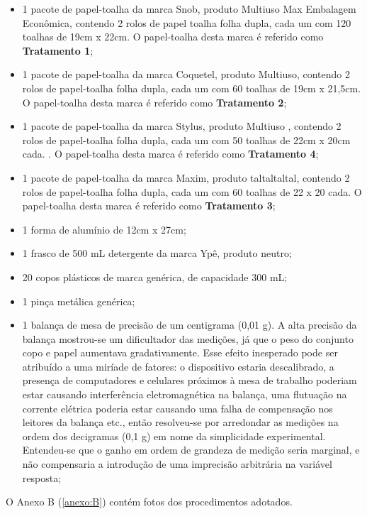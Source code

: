 \documentclass[a4paper,12pt,notitlepage]{article}
\begin{document}
\begin{itemize}
    \item 1 pacote de papel-toalha da marca Snob, produto Multiuso Max Embalagem Econômica, contendo 2 rolos de papel toalha folha dupla, cada um com 120 toalhas de 19cm x 22cm. O papel-toalha desta marca é referido como \textbf{Tratamento 1};
    \item 1 pacote de papel-toalha da marca Coquetel, produto Multiuso, contendo 2 rolos de papel-toalha folha dupla, cada um com 60 toalhas de 19cm x 21,5cm. O papel-toalha desta marca é referido como \textbf{Tratamento 2};
    \item 1 pacote de papel-toalha da marca Stylus, produto Multiuso , contendo 2 rolos de papel-toalha folha dupla, cada um com 50 toalhas de 22cm x 20cm cada. . O papel-toalha desta marca é referido como \textbf{Tratamento 4};
    \item 1 pacote de papel-toalha da marca Maxim, produto taltaltaltal, contendo 2 rolos de papel-toalha folha dupla, cada um com 60 toalhas de 22 x 20 cada. O papel-toalha desta marca é referido como \textbf{Tratamento 3};
    \item 1 forma de alumínio de 12cm x 27cm;
    \item 1 frasco de 500 mL detergente da marca Ypê, produto neutro;
    \item 20 copos plásticos de marca genérica, de capacidade 300 mL;
    \item 1 pinça metálica genérica;
    \item 1 balança de mesa de precisão de um centigrama (0,01 g). A alta precisão da balança mostrou-se um dificultador das medições, já que o peso do conjunto copo e papel aumentava gradativamente. Esse efeito inesperado pode ser atribuído a uma miríade de fatores: o dispositivo estaria descalibrado, a presença de computadores e celulares próximos à mesa de trabalho poderiam estar causando interferência eletromagnética na balança, uma flutuação na corrente elétrica poderia estar causando uma falha de compensação nos leitores da balança etc., então resolveu-se por arredondar as medições na ordem dos decigramas (0,1 g) em nome da simplicidade experimental. Entendeu-se que o ganho em ordem de grandeza de medição seria marginal, e não compensaria a introdução de uma imprecisão arbitrária na variável resposta;
    \end{itemize}
    
    O Anexo B (\ref{anexo:B}) contém fotos dos procedimentos adotados.
\end{document}
